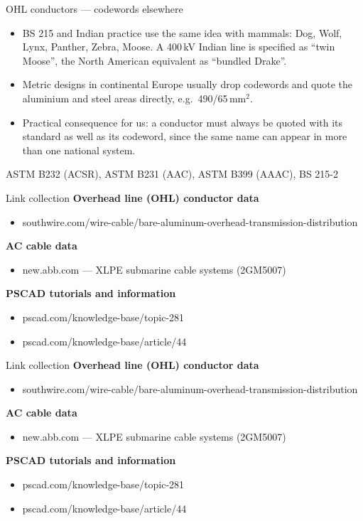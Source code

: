 \begin{frame}{OHL conductors --- codewords elsewhere}
  \begin{itemize}
    \setlength{\itemsep}{0.5em}
    \item BS 215 and Indian practice use the same idea with mammals:
          Dog, Wolf, Lynx, Panther, Zebra, Moose. A 400\,kV Indian line is
          specified as ``twin Moose'', the North American equivalent as
          ``bundled Drake''.
    \item Metric designs in continental Europe usually drop codewords and
          quote the aluminium and steel areas directly, e.g.\ 490/65\,mm$^2$.
    \item Practical consequence for us: a conductor must always be quoted
          with its standard as well as its codeword, since the same name can
          appear in more than one national system.
  \end{itemize}
  \vspace{0.5em}
  {\color{atGray}\footnotesize ASTM B232 (ACSR), ASTM B231 (AAC), ASTM B399 (AAAC), BS 215-2}
\end{frame}


\begin{frame}{Link collection}
  \textbf{Overhead line (OHL) conductor data}
  \begin{itemize}
    \item {\footnotesize southwire.com/wire-cable/bare-aluminum-overhead-transmission-distribution}
  \end{itemize}
  \textbf{AC cable data}
  \begin{itemize}
    \item {\footnotesize new.abb.com --- XLPE submarine cable systems (2GM5007)}
  \end{itemize}
  \textbf{PSCAD tutorials and information}
  \begin{itemize}
    \item {\footnotesize pscad.com/knowledge-base/topic-281}
    \item {\footnotesize pscad.com/knowledge-base/article/44}
  \end{itemize}
\end{frame}

\begin{frame}{Link collection}
  \textbf{Overhead line (OHL) conductor data}
  \begin{itemize}
    \item {\footnotesize southwire.com/wire-cable/bare-aluminum-overhead-transmission-distribution}
  \end{itemize}
  \textbf{AC cable data}
  \begin{itemize}
    \item {\footnotesize new.abb.com --- XLPE submarine cable systems (2GM5007)}
  \end{itemize}
  \textbf{PSCAD tutorials and information}
  \begin{itemize}
    \item {\footnotesize pscad.com/knowledge-base/topic-281}
    \item {\footnotesize pscad.com/knowledge-base/article/44}
  \end{itemize}
\end{frame}